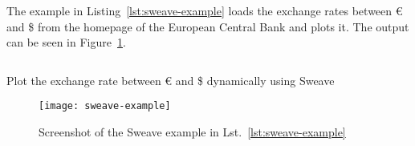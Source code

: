 The example in Listing~\ref{lst:sweave-example} loads the exchange rates between
\euro{} and \$ from the homepage of the European Central Bank and plots it. The
output can be seen in Figure~\ref{fig:sweave-example}.

\begin{listing}[H]
  \inputminted{latex}{../examples/sweave-example.Snw}
  \caption{Plot the exchange rate between \euro{} and \$ dynamically using
    Sweave}
  \label{lst:sweave-example}
\end{listing}
\begin{figure}[!t]
  \texttt{[image: sweave-example]}
  \caption{Screenshot of the Sweave example in Lst.~\ref{lst:sweave-example}}
  \label{fig:sweave-example}
\end{figure}
